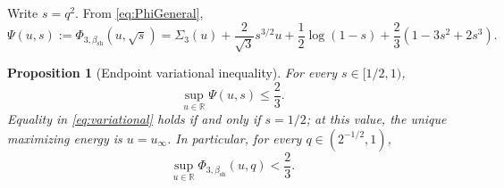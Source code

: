 \documentclass[11pt,reqno]{amsart}
\numberwithin{equation}{section}
\theoremstyle{plain}
\newtheorem{proposition}[proposition]{Proposition}
\theoremstyle{definition}
\theoremstyle{remark}
\newcommand{\R}{\mathbb R}
\newcommand{\1}{\mathbf 1}
\newcommand{\bsh}{\beta_{\mathrm{sh}}}
\begin{document}
Write \(s=q^2\).  From \eqref{eq:PhiGeneral},
\begin{equation}\label{eq:Psi}
 \Psi(u,s):=\Phi_{3,\bsh}(u,\sqrt s)
 =\Sigma_3(u)
  +\frac2{\sqrt3}s^{3/2}u
  +\frac12\log(1-s)
  +\frac23(1-3s^2+2s^3).
\end{equation}

\begin{proposition}[Endpoint variational inequality]\label{prop:variational}
For every \(s\in[1/2,1)\),
\begin{equation}\label{eq:variational}
 \sup_{u\in\R}\Psi(u,s)\leq\frac23.
\end{equation}
Equality in \eqref{eq:variational} holds if and only if \(s=1/2\); at
this value, the unique maximizing energy is \(u=u_\infty\).  In
particular, for every \(q\in(2^{-1/2},1)\),
\begin{equation}\label{eq:strictgap}
 \sup_{u\in\R}\Phi_{3,\bsh}(u,q)<\frac23.
\end{equation}
\end{proposition}
\end{document}
